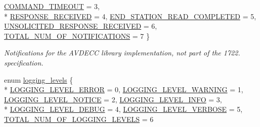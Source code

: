 \begin{DoxyCompactItemize}
\hyperlink{namespaceavdecc__lib_ad2a3e740ca3019cf9fd0f9514afb6419a3aade74a66ec6e710103bd63b10d661f}{C\+O\+M\+M\+A\+N\+D\+\_\+\+T\+I\+M\+E\+O\+UT} = 3, 
\\*
\hyperlink{namespaceavdecc__lib_ad2a3e740ca3019cf9fd0f9514afb6419a76526acf7fff481667c4ec404347c3ce}{R\+E\+S\+P\+O\+N\+S\+E\+\_\+\+R\+E\+C\+E\+I\+V\+ED} = 4, 
\hyperlink{namespaceavdecc__lib_ad2a3e740ca3019cf9fd0f9514afb6419a7960450a1155da37ad7a74bc875106ec}{E\+N\+D\+\_\+\+S\+T\+A\+T\+I\+O\+N\+\_\+\+R\+E\+A\+D\+\_\+\+C\+O\+M\+P\+L\+E\+T\+ED} = 5, 
\hyperlink{namespaceavdecc__lib_ad2a3e740ca3019cf9fd0f9514afb6419aadf251eb45e15833d30338bfdbc0e243}{U\+N\+S\+O\+L\+I\+C\+I\+T\+E\+D\+\_\+\+R\+E\+S\+P\+O\+N\+S\+E\+\_\+\+R\+E\+C\+E\+I\+V\+ED} = 6, 
\hyperlink{namespaceavdecc__lib_ad2a3e740ca3019cf9fd0f9514afb6419a8b2d9a6d1dd9e32330f819a39409b09e}{T\+O\+T\+A\+L\+\_\+\+N\+U\+M\+\_\+\+O\+F\+\_\+\+N\+O\+T\+I\+F\+I\+C\+A\+T\+I\+O\+NS} = 7
 \}\begin{DoxyCompactList}\small\item\em Notifications for the A\+V\+D\+E\+CC library implementation, not part of the 1722. specification. \end{DoxyCompactList}
\item 
enum \hyperlink{namespaceavdecc__lib_a501055c431e6872ef46f252ad13f85cd}{logging\+\_\+levels} \{ \\*
\hyperlink{namespaceavdecc__lib_a501055c431e6872ef46f252ad13f85cdaf2c4481208273451a6f5c7bb9770ec8a}{L\+O\+G\+G\+I\+N\+G\+\_\+\+L\+E\+V\+E\+L\+\_\+\+E\+R\+R\+OR} = 0, 
\hyperlink{namespaceavdecc__lib_a501055c431e6872ef46f252ad13f85cda73e497c552710fe969c37fafc6d59f97}{L\+O\+G\+G\+I\+N\+G\+\_\+\+L\+E\+V\+E\+L\+\_\+\+W\+A\+R\+N\+I\+NG} = 1, 
\hyperlink{namespaceavdecc__lib_a501055c431e6872ef46f252ad13f85cda111acaa1af34b7059f578c5f073be78a}{L\+O\+G\+G\+I\+N\+G\+\_\+\+L\+E\+V\+E\+L\+\_\+\+N\+O\+T\+I\+CE} = 2, 
\hyperlink{namespaceavdecc__lib_a501055c431e6872ef46f252ad13f85cda83cf28d9171867799cee2619810e1c01}{L\+O\+G\+G\+I\+N\+G\+\_\+\+L\+E\+V\+E\+L\+\_\+\+I\+N\+FO} = 3, 
\\*
\hyperlink{namespaceavdecc__lib_a501055c431e6872ef46f252ad13f85cdae3138c2a0a71a6404155ff912e450406}{L\+O\+G\+G\+I\+N\+G\+\_\+\+L\+E\+V\+E\+L\+\_\+\+D\+E\+B\+UG} = 4, 
\hyperlink{namespaceavdecc__lib_a501055c431e6872ef46f252ad13f85cdaee10ea7e3b81aa9496eab6a9c80adb1d}{L\+O\+G\+G\+I\+N\+G\+\_\+\+L\+E\+V\+E\+L\+\_\+\+V\+E\+R\+B\+O\+SE} = 5, 
\hyperlink{namespaceavdecc__lib_a501055c431e6872ef46f252ad13f85cdaa5712f55b81ef86fafd150c81ba0fc14}{T\+O\+T\+A\+L\+\_\+\+N\+U\+M\+\_\+\+O\+F\+\_\+\+L\+O\+G\+G\+I\+N\+G\+\_\+\+L\+E\+V\+E\+LS} = 6

\end{DoxyCompactItemize}
